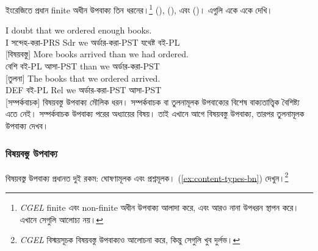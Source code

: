 ইংরেজিতে প্রধান finite অধীন উপবাক্য তিন ধরনের।\footnote{\textit{CGEL} finite এবং non-finite অধীন উপবাক্য আলাদা করে, এবং আরও নানা উপধরন স্থাপন করে। এখানে সেগুলি আলোচ্য নয়।}  (),  (), এবং  ()। এগুলি একে একে দেখি।

\ea \label{ex:sub-types-bn}
    \ea \gll I doubt that we ordered enough books.\\
        I সন্দেহ-করা-PRS Sdr we অর্ডার-করা-PST যথেষ্ট বই-PL\\
    \glt {} [বিষয়বস্তু]
    \ex \gll More books arrived than we had ordered.\\
        বেশি বই-PL আসা-PST than we অর্ডার-করা-PST\\
    \glt {} [তুলনা]
    \ex \gll The books that we ordered arrived.\\
        DEF বই-PL Rel we অর্ডার-করা-PST আসা-PST\\
    \glt {} [সম্পর্কবাচক]
    \z
\z
বিষয়বস্তু উপবাক্য মৌলিক ধরন। সম্পর্কবাচক বা তুলনামূলক উপবাক্যের বিশেষ বাক্যতাত্ত্বিক বৈশিষ্ট্য এতে নেই। সম্পর্কবাচক উপবাক্য পরের অধ্যায়ের বিষয়। তাই এখানে আগে বিষয়বস্তু উপবাক্য, তারপর তুলনামূলক উপবাক্য দেখব।

\subsubsection{বিষয়বস্তু উপবাক্য}

বিষয়বস্তু উপবাক্য প্রধানত দুই রকম: ঘোষণামূলক এবং প্রশ্নমূলক। (\ref{ex:content-types-bn}) দেখুন।\footnote{\textit{CGEL} বিস্ময়সূচক বিষয়বস্তু উপবাক্যও আলোচনা করে, কিন্তু সেগুলি খুব দুর্লভ।}

